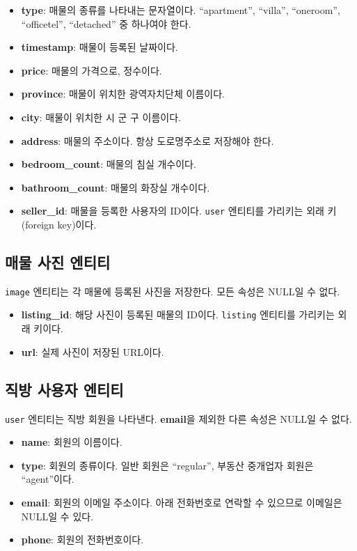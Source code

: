 \documentclass{article}
\newcommand\code[1]{
  \texttt{\large{#1}}
}
\begin{document}
\begin{itemize}
\item \textbf{type}: 매물의 종류를 나타내는 문자열이다. ``apartment'', ``villa'', ``oneroom'', ``officetel'', ``detached'' 중 하나여야 한다.
\item \textbf{timestamp}: 매물이 등록된 날짜이다.
\item \textbf{price}: 매물의 가격으로, 정수이다.
\item \textbf{province}: 매물이 위치한 광역자치단체 이름이다.
\item \textbf{city}: 매물이 위치한 시 \cdot 군 \cdot 구 이름이다.
\item \textbf{address}: 매물의 주소이다. 항상 도로명주소로 저장해야 한다.
\item \textbf{bedroom\_count}: 매물의 침실 개수이다.
\item \textbf{bathroom\_count}: 매물의 화장실 개수이다.
\item \textbf{seller\_id}: 매물을 등록한 사용자의 ID이다. \code{user} 엔티티를 가리키는 외래 키(foreign key)이다.
\end{itemize}

\subsection{매물 사진 엔티티}

\code{image} 엔티티는 각 매물에 등록된 사진을 저장한다.
모든 속성은 NULL일 수 없다.

\begin{itemize}
\item \textbf{listing\_id}: 해당 사진이 등록된 매물의 ID이다. \code{listing} 엔티티를 가리키는 외래 키이다.
\item \textbf{url}: 실제 사진이 저장된 URL이다.
\end{itemize}

\subsection{직방 사용자 엔티티}

\code{user} 엔티티는 직방 회원을 나타낸다.
\textbf{email}을 제외한 다른 속성은 NULL일 수 없다.

\begin{itemize}
\item \textbf{name}: 회원의 이름이다.
\item \textbf{type}: 회원의 종류이다. 일반 회원은 ``regular'', 부동산 중개업자 회원은 ``agent''이다.
\item \textbf{email}: 회원의 이메일 주소이다. 아래 전화번호로 연락할 수 있으므로 이메일은 NULL일 수 있다.
\item \textbf{phone}: 회원의 전화번호이다.
\end{itemize}
\end{document}
